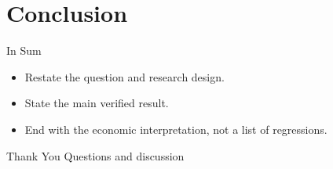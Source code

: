 \section{Conclusion}

\begin{frame}{In Sum}
  \begin{itemize}
    \item Restate the question and research design.
    \item State the main verified result.
    \item End with the economic interpretation, not a list of regressions.
  \end{itemize}
\end{frame}

\begin{frame}{Thank You}
  \centering
  \vfill
  Questions and discussion
  \vfill
\end{frame}
